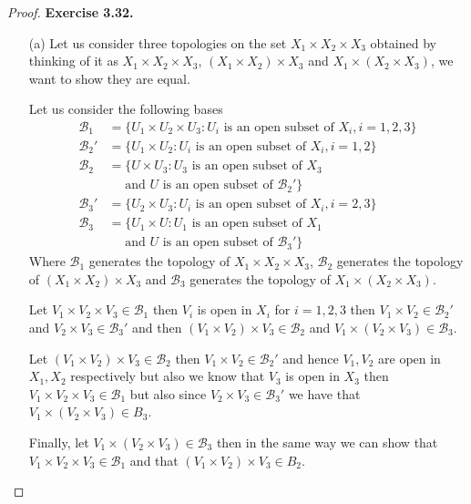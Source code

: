 \documentclass[11pt]{article}
\theoremstyle{definition}
\begin{document}
\cleardoublepage
\begin{proof}{\textbf{Exercise 3.32.}}
\begin{itemize}
    \item [(a)] Let us consider three topologies on the set
    $X_1 \times X_2 \times X_3$ obtained by thinking of it as
    $X_1 \times X_2 \times X_3$, $(X_1 \times X_2) \times X_3$ and 
    $X_1 \times (X_2 \times X_3)$, we want to show they are equal.

    Let us consider the following bases
    \begin{align*}
        \mathcal{B}_1 &= \{U_1 \times U_2 \times U_3
        : U_i \text{ is an open subset of }X_i, i= 1,2,3\}\\
        \mathcal{B}_2' &= \{U_1 \times U_2
        : U_i \text{ is an open subset of }X_i, i= 1,2\}\\
        \mathcal{B}_2 &= \{U \times U_3
        : U_3 \text{ is an open subset of }X_3\\
        &\quad\text{ and }U\text{ is an open subset of }\mathcal{B}_2' \}\\
        \mathcal{B}_3' &= \{U_2 \times U_3
        : U_i \text{ is an open subset of }X_i, i= 2,3\}\\
        \mathcal{B}_3 &= \{U_1 \times U
        : U_1 \text{ is an open subset of }X_1\\
        &\quad\text{ and }U\text{ is an open subset of }\mathcal{B}_3' \}
    \end{align*}
    Where $\mathcal{B}_1$ generates the topology of $X_1 \times X_2 \times X_3$,
    $\mathcal{B}_2$ generates the topology of $(X_1 \times X_2)\times X_3$ and
    $\mathcal{B}_3$ generates the topology of $X_1 \times (X_2 \times X_3)$.

    Let $V_1 \times V_2 \times V_3 \in \mathcal{B}_1$ then
    $V_i$ is open in $X_i$ for $i =1, 2, 3$ then
    $V_1 \times V_2 \in \mathcal{B}_2'$ and $V_2 \times V_3 \in \mathcal{B}_3'$
    and then $(V_1 \times V_2) \times V_3 \in \mathcal{B}_2$
    and $V_1 \times (V_2 \times V_3) \in \mathcal{B}_3$.

    Let $(V_1 \times V_2) \times V_3 \in \mathcal{B}_2$ then
    $V_1 \times V_2 \in \mathcal{B}_2'$ and hence $V_1,V_2$ are open in $X_1,X_2$
    respectively but also we know that $V_3$ is open in $X_3$ then
    $V_1 \times V_2 \times V_3 \in \mathcal{B}_1$
    but also since $V_2 \times V_3 \in \mathcal{B}_3'$ we have that
    $V_1 \times (V_2 \times V_3) \in B_3$.

    Finally, let $V_1 \times (V_2 \times V_3) \in \mathcal{B}_3$ then in the
    same way we can show that $V_1 \times V_2 \times V_3 \in \mathcal{B}_1$
    and that $(V_1 \times V_2) \times V_3 \in B_2$.


\end{itemize}
\end{proof}
\end{document}

